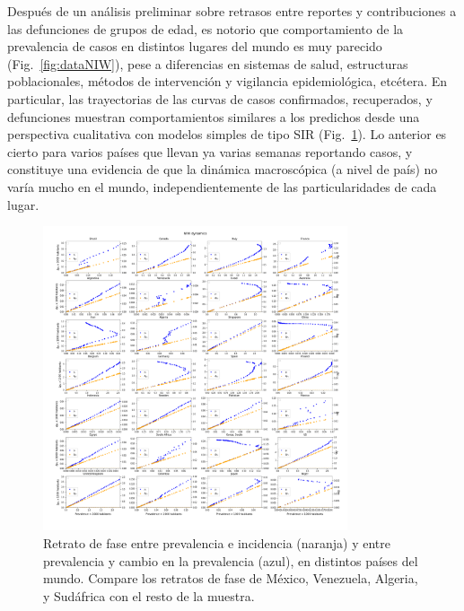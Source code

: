 \documentclass[8pt]{article}
\begin{document}
Después de un análisis preliminar sobre retrasos entre reportes y contribuciones a las defunciones de grupos de edad, es notorio que comportamiento de la prevalencia de casos en distintos lugares del mundo es muy parecido (Fig.~\ref{fig:dataNIW}), pese a diferencias en sistemas de salud, estructuras poblacionales, métodos de intervención y vigilancia epidemiológica, etcétera. En particular, las trayectorias de las curvas de casos confirmados, recuperados, y defunciones muestran comportamientos similares a los predichos desde una perspectiva cualitativa con modelos simples de tipo SIR (Fig.~\ref{fig:dataPPNIW}). 
Lo anterior es cierto para varios países que llevan ya varias semanas reportando casos, y constituye una evidencia de que la dinámica macroscópica (a nivel de país) no varía mucho en el mundo, independientemente de las particularidades de cada lugar. 

\begin{figure}[th] 
\centering
\includegraphics[width=0.8\textwidth]{figures/dam_COVID19_JHU_dynamicsDataSIRPP_globalSample}
\caption{Retrato de fase entre prevalencia e incidencia (naranja) y entre prevalencia y cambio en la prevalencia (azul),  en distintos países del mundo. Compare los retratos de fase de México, Venezuela, Algeria, y Sudáfrica con el resto de la muestra.}\label{fig:dataPPNIW}
\end{figure}
\end{document}
